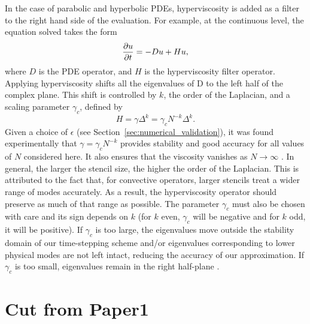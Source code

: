 In the case of parabolic and hyperbolic PDEs, hyperviscosity is added as a filter to the right hand side of the evaluation. For example, at the continuous level, 
the equation solved takes the form
\begin{equation}
\frac{\partial u}{\partial t} = - D u + H u,
\label{eq:evaluation_with_hyperviscosity}
\end{equation}
where $D$ is the PDE operator, and $H$ is the hyperviscosity filter operator.
Applying hyperviscosity shifts all the eigenvalues of D to the left half of the complex plane. 
This shift is controlled by $k$, the order of the Laplacian, and a scaling parameter $\gamma_c$, defined by
\begin{equation*}	
H = \gamma \Delta^{k} = \gamma_c N^{-k} \Delta^{k}.
\end{equation*}
Given a choice of $\epsilon$ (see Section~\ref{sec:numerical_validation}), it was found experimentally that $\gamma = \gamma_c N^{-k}$  provides stability and good accuracy for all values of $N$ considered here. It also ensures that the viscosity vanishes as $N\rightarrow\infty$ \cite{FlyerLehto11}.
In general, the larger the stencil size, the higher the order of the Laplacian.  This is attributed to the fact that, for convective operators, larger stencils treat a wider range of modes accurately. As a result, the hyperviscosity operator should preserve as much of that range as possible. The parameter $\gamma_c$ must also be chosen with care and its sign depends on $k$ (for $k$ even, $\gamma_c$ will be negative and for $k$ odd, it will be positive). If $\gamma_c$ is too large, the eigenvalues move outside the stability domain of our time-stepping scheme and/or eigenvalues corresponding to lower physical modes are not left intact, reducing the accuracy of our approximation. If $\gamma_c$ is too small, eigenvalues remain in the right half-plane \cite{FornbergLehto11,FlyerLehto11}.


\section{Cut from Paper1}

